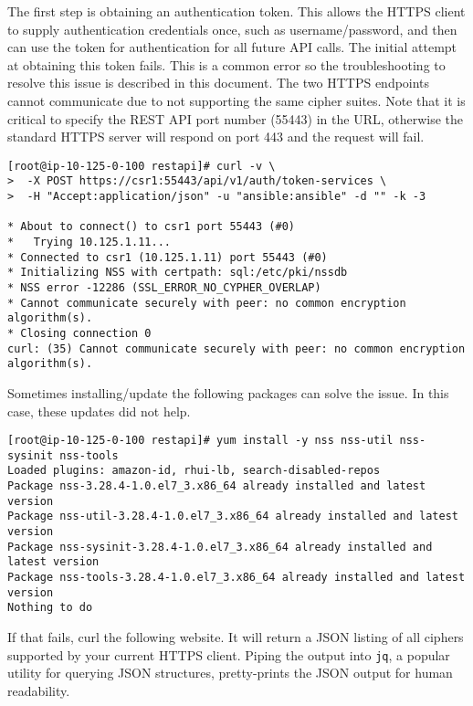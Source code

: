 The first step is obtaining an authentication token. This allows the HTTPS
client to supply authentication credentials once, such as username/password,
and then can use the token for authentication for all future API calls. The
initial attempt at obtaining this token fails. This is a common error so the
troubleshooting to resolve this issue is described in this document. The two
HTTPS endpoints cannot communicate due to not supporting the same cipher
suites. Note that it is critical to specify the REST API port number (55443)
in the URL, otherwise the standard HTTPS server will respond on port 443 and
the request will fail.

\begin{verbatim}
[root@ip-10-125-0-100 restapi]# curl -v \
>  -X POST https://csr1:55443/api/v1/auth/token-services \
>  -H "Accept:application/json" -u "ansible:ansible" -d "" -k -3

* About to connect() to csr1 port 55443 (#0)
*   Trying 10.125.1.11...
* Connected to csr1 (10.125.1.11) port 55443 (#0)
* Initializing NSS with certpath: sql:/etc/pki/nssdb
* NSS error -12286 (SSL_ERROR_NO_CYPHER_OVERLAP)
* Cannot communicate securely with peer: no common encryption algorithm(s).
* Closing connection 0
curl: (35) Cannot communicate securely with peer: no common encryption algorithm(s).
\end{verbatim}

Sometimes installing/update the following packages can solve the issue. In
this case, these updates did not help.

\begin{verbatim}
[root@ip-10-125-0-100 restapi]# yum install -y nss nss-util nss-sysinit nss-tools
Loaded plugins: amazon-id, rhui-lb, search-disabled-repos
Package nss-3.28.4-1.0.el7_3.x86_64 already installed and latest version
Package nss-util-3.28.4-1.0.el7_3.x86_64 already installed and latest version
Package nss-sysinit-3.28.4-1.0.el7_3.x86_64 already installed and latest version
Package nss-tools-3.28.4-1.0.el7_3.x86_64 already installed and latest version
Nothing to do
\end{verbatim}

If that fails, curl the following website. It will return a JSON listing of
all ciphers supported by your current HTTPS client. Piping the output into
\verb|jq|, a popular utility for querying JSON structures, pretty-prints the JSON
output for human readability.

